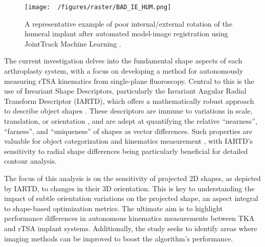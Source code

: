 \begin{figure}[h!]
	\centering
	\texttt{[image: ~/figures/raster/BAD\_IE\_HUM.png]}
	\caption[A representative example of poor internal/external rotation of the humeral implant after automated model-image registration using JointTrack Machine Learning]{A representative example of poor internal/external rotation of the humeral implant after automated model-image registration using JointTrack Machine Learning \cite{jensenJointTrackMachine2023}.}
	\label{fig:bad_ie_hum}
\end{figure}

The current investigation delves into the fundamental shape aspects of each arthroplasty system, with a focus on developing a method for autonomously measuring rTSA kinematics from single-plane fluoroscopy.
Central to this is the use of Invariant Shape Descriptors, particularly the Invariant Angular Radial Transform Descriptor (IARTD), which offers a mathematically robust approach to describe object shapes \cite{leeNewShapeDescription2012}.
These descriptors are immune to variations in scale, translation, or orientation \cite{zhangReviewShapeRepresentation2004}, and are adept at quantifying the relative ``nearness'', ``farness'', and ``uniqueness'' of shapes as vector differences.
Such properties are valuable for object categorization \cite{richardIdentificationThreeDimensionalObjects1974,wallaceAnalysisThreedimensionalMovement1980,wallaceEfficientThreedimensionalAircraft1980} and kinematics measurement \cite{banksAccurateMeasurementThreedimensional1996}, with IARTD's sensitivity to radial shape differences \cite{leeNewShapeDescription2012} being particularly beneficial for detailed contour analysis.

The focus of this analysis is on the sensitivity of projected 2D shapes, as depicted by IARTD, to changes in their 3D orientation.
This is key to understanding the impact of subtle orientation variations on the projected shape, an aspect integral to shape-based optimization metrics.
The ultimate aim is to highlight performance differences in autonomous kinematics measurements between TKA and rTSA implant systems.
Additionally, the study seeks to identify areas where imaging methods can be improved to boost the algorithm's performance.

